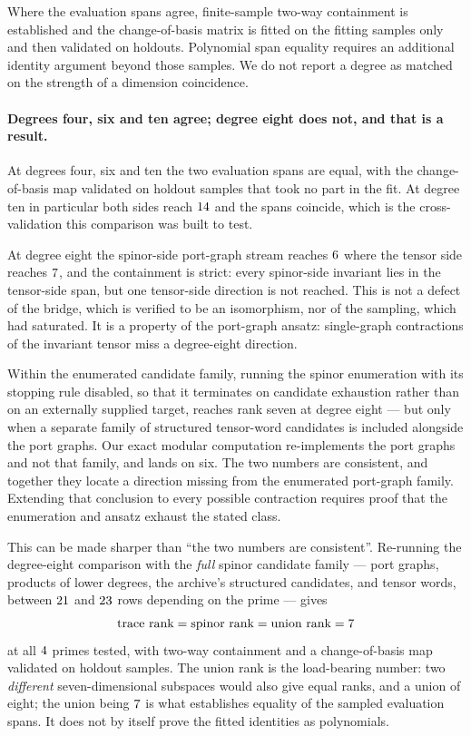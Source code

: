 \documentclass[11pt,a4paper]{article}
\begin{document}
Where the evaluation spans agree, finite-sample two-way containment is
established and the change-of-basis matrix is fitted on the fitting samples
only and then validated on holdouts. Polynomial span equality requires an
additional identity argument beyond those samples. We do not report a degree as matched on the
strength of a dimension coincidence.

\paragraph{Degrees four, six and ten agree; degree eight does not, and that is a
result.} At degrees four, six and ten the two evaluation spans are equal, with
the change-of-basis map validated on holdout samples that took no part in the
fit. At degree ten in particular both sides reach $14$ and the
spans coincide, which is the cross-validation this comparison was built to test.

At degree eight the spinor-side port-graph stream reaches
$6$ where the tensor side reaches $7$, and the
containment is strict: every spinor-side invariant lies in the tensor-side span,
but one tensor-side direction is not reached. This is not a defect of the bridge,
which is verified to be an isomorphism, nor of the sampling, which had saturated.
It is a property of the port-graph ansatz: single-graph contractions of the
invariant tensor miss a degree-eight direction.

Within the enumerated candidate family, running the spinor enumeration with its
stopping rule disabled, so that it terminates on candidate exhaustion rather than
on an externally supplied target, reaches rank seven at degree eight --- but only
when a separate family of structured tensor-word candidates is included alongside
the port graphs. Our exact modular computation re-implements the port graphs and
not that family, and lands on six. The two numbers are consistent, and together
they locate a direction missing from the enumerated port-graph family.
Extending that conclusion to every possible contraction requires proof that
the enumeration and ansatz exhaust the stated class.

This can be made sharper than ``the two numbers are consistent''. Re-running the
degree-eight comparison with the \emph{full} spinor candidate family --- port
graphs, products of lower degrees, the archive's structured candidates, and
tensor words, between $21$ and $23$ rows
depending on the prime --- gives
\begin{equation}
  \text{trace rank} = \text{spinor rank} = \text{union rank}
  = 7
\end{equation}
at all $4$ primes tested, with two-way containment and a
change-of-basis map validated on holdout samples. The union rank is the
load-bearing number: two \emph{different} seven-dimensional subspaces would also
give equal ranks, and a union of eight; the union being $7$ is
what establishes equality of the sampled evaluation spans. It does not by
itself prove the fitted identities as polynomials.
\end{document}
